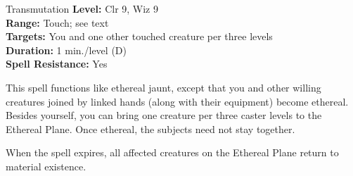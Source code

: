 {Transmutation}
{
	\textbf{Level:}
	Clr 9, Wiz 9\\
	\textbf{Range:}
	Touch; see text\\
	\textbf{Targets:}
	You and one other touched creature per three levels\\
	\textbf{Duration:}
	1 min./level (D)\\
	\textbf{Spell Resistance:}
	Yes\\
}
{
	This spell functions like ethereal jaunt, except that you and other willing creatures joined by linked hands (along with their equipment) become ethereal. Besides yourself, you can bring one creature per three caster levels to the Ethereal Plane. Once ethereal, the subjects need not stay together.

	When the spell expires, all affected creatures on the Ethereal Plane return to material existence.

}
